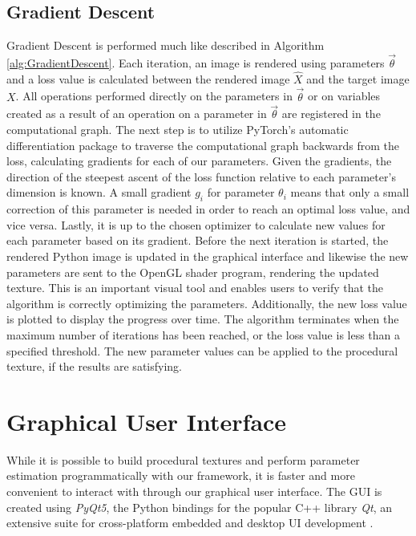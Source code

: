 \subsection{Gradient Descent}


Gradient Descent is performed much like described in Algorithm \ref{alg:GradientDescent}. Each iteration, an image is rendered using parameters $\vec{\theta}$ and a loss value is calculated between the rendered image $\hat{X}$ and the target image $X$. All operations performed directly on the parameters in $\vec{\theta}$ or on variables created as a result of an operation on a parameter in $\vec{\theta}$ are registered in the computational graph. The next step is to utilize PyTorch's automatic differentiation package to traverse the computational graph backwards from the loss, calculating gradients for each of our parameters. Given the gradients, the direction of the steepest ascent of the loss function relative to each parameter's dimension is known. A small gradient $g_i$ for parameter $\theta_i$ means that only a small correction of this parameter is needed in order to reach an optimal loss value, and vice versa. Lastly, it is up to the chosen optimizer to calculate new values for each parameter based on its gradient. Before the next iteration is started, the rendered Python image is updated in the graphical interface and likewise the new parameters are sent to the OpenGL shader program, rendering the updated texture. This is an important visual tool and enables users to verify that the algorithm is correctly optimizing the parameters. Additionally, the new loss value is plotted to display the progress over time. The algorithm terminates when the maximum number of iterations has been reached, or the loss value is less than a specified threshold. The new parameter values can be applied to the procedural texture, if the results are satisfying. 

\section{Graphical User Interface}

While it is possible to build procedural textures and perform parameter estimation programmatically with our framework, it is faster and more convenient to interact with \dipter{} through our graphical user interface. The GUI is created using \textit{PyQt5}, the Python bindings for the popular C++ library \textit{Qt}, an extensive suite for cross-platform embedded and desktop UI development \cite{riverbankcomputing_2020_what,theqtcompany_qt}.

